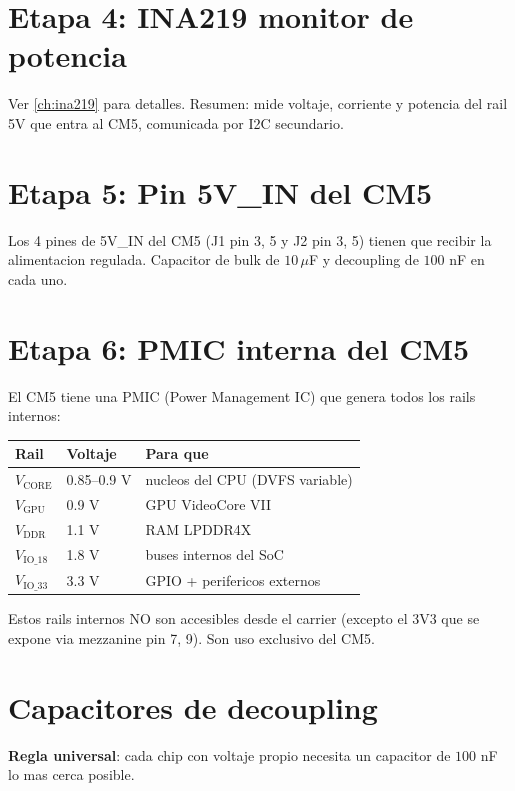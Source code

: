 \documentclass[11pt,a4paper,oneside,openright]{book}
\begin{document}
\section{Etapa 4: INA219 monitor de potencia}

Ver \autoref{ch:ina219} para detalles. Resumen: mide voltaje, corriente y
potencia del rail 5V que entra al CM5, comunicada por I2C secundario.

\section{Etapa 5: Pin 5V\_IN del CM5}

Los 4 pines de 5V\_IN del CM5 (J1 pin 3, 5 y J2 pin 3, 5) tienen que
recibir la alimentacion regulada. Capacitor de bulk de $10\,\mu$F y
decoupling de $100$ nF en cada uno.

\section{Etapa 6: PMIC interna del CM5}

El CM5 tiene una PMIC (Power Management IC) que genera todos los rails
internos:

\begin{center}
\begin{tabular}{lll}
\toprule
\textbf{Rail} & \textbf{Voltaje} & \textbf{Para que} \\
\midrule
$V_{\text{CORE}}$  & 0.85--0.9 V & nucleos del CPU (DVFS variable) \\
$V_{\text{GPU}}$   & 0.9 V       & GPU VideoCore VII \\
$V_{\text{DDR}}$   & 1.1 V       & RAM LPDDR4X \\
$V_{\text{IO\_18}}$& 1.8 V       & buses internos del SoC \\
$V_{\text{IO\_33}}$& 3.3 V       & GPIO + perifericos externos \\
\bottomrule
\end{tabular}
\end{center}

Estos rails internos NO son accesibles desde el carrier (excepto el 3V3
que se expone via mezzanine pin 7, 9). Son uso exclusivo del CM5.

\section{Capacitores de decoupling}

\textbf{Regla universal}: cada chip con voltaje propio necesita un
capacitor de $100$ nF lo mas cerca posible.
\end{document}
